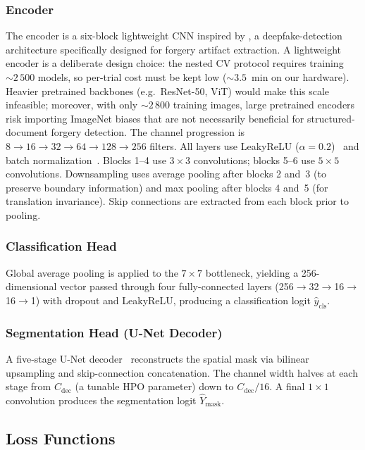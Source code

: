 \subsubsection{Encoder}
The encoder is a six-block lightweight CNN inspired by \citet{patel2023dcnn},
a deepfake-detection architecture specifically designed for forgery artifact
extraction. A lightweight encoder is a deliberate design choice: the nested
CV protocol requires training ${\sim}2\,500$ models, so per-trial cost must
be kept low (${\sim}3.5$~min on our hardware). Heavier pretrained backbones
(e.g.\ ResNet-50, ViT) would make this scale infeasible; moreover, with only
${\sim}2\,800$ training images, large pretrained encoders risk importing
ImageNet biases that are not necessarily beneficial for structured-document
forgery detection. The channel progression is $8 \to 16 \to 32 \to 64 \to 128 \to
256$ filters. All layers use LeakyReLU ($\alpha=0.2$)~\citep{leakyrelu2015}
and batch normalization~\citep{batchnorm2015}. Blocks 1--4 use $3 \times 3$
convolutions; blocks 5--6 use $5 \times 5$ convolutions. Downsampling uses
average pooling after blocks 2 and~3 (to preserve boundary information) and
max pooling after blocks 4 and~5 (for translation invariance). Skip connections
are extracted from each block prior to pooling.

\subsubsection{Classification Head}
Global average pooling is applied to the $7 \times 7$ bottleneck, yielding a
256-dimensional vector passed through four fully-connected layers
(256$\to$32$\to$16$\to$16$\to$1) with dropout and LeakyReLU, producing a
classification logit $\hat{y}_{\text{cls}}$.

\subsubsection{Segmentation Head (U-Net Decoder)}
A five-stage U-Net decoder~\citep{unet2015} reconstructs the spatial mask via
bilinear upsampling and skip-connection concatenation. The channel width halves
at each stage from $C_{\text{dec}}$ (a tunable HPO parameter) down to
$C_{\text{dec}}/16$. A final $1 \times 1$ convolution produces the
segmentation logit $\hat{Y}_{\text{mask}}$.

\subsection{Loss Functions}
\label{subsec:loss}

